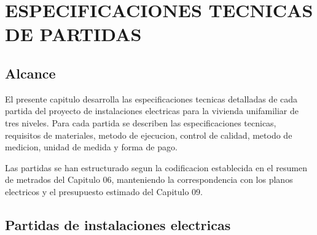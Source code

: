 \chapter{ESPECIFICACIONES TECNICAS DE PARTIDAS}

\section{Alcance}

El presente capitulo desarrolla las especificaciones tecnicas detalladas de cada partida del proyecto de instalaciones electricas para la vivienda unifamiliar de tres niveles. Para cada partida se describen las especificaciones tecnicas, requisitos de materiales, metodo de ejecucion, control de calidad, metodo de medicion, unidad de medida y forma de pago.

Las partidas se han estructurado segun la codificacion establecida en el resumen de metrados del Capitulo 06, manteniendo la correspondencia con los planos electricos y el presupuesto estimado del Capitulo 09.

\section{Partidas de instalaciones electricas}


\clearpage

\clearpage

\clearpage

\clearpage

\clearpage

